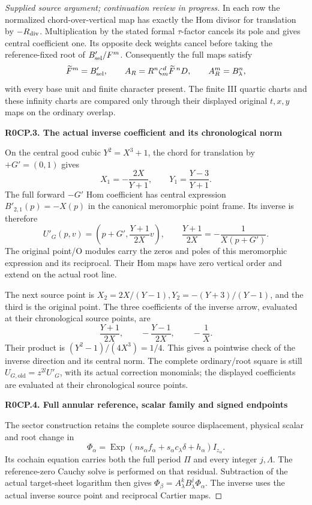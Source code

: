 \begin{proof}[Supplied source argument; continuation review in progress]
In each row the normalized chord-over-vertical map has exactly the
Hom divisor for translation by \(-R_{\rm div}\). Multiplication by
the stated formal \(\tau\)-factor cancels its pole and gives central
coefficient one. Its opposite deck weights cancel before taking the
reference-fixed root of \(B'_{\rm sel}/F^m\). Consequently the full
maps satisfy
\[
 \widetilde F^m=B'_{\rm sel},\qquad
 A_R=R^n\zeta_m^d\widetilde F^{\,n}D,\qquad
 A_R^m=B_\lambda^n,
\]
with every base unit and finite character present. The finite III
quartic charts and these infinity charts are compared only through
their displayed original \(t,x,y\) maps on the ordinary overlap.

\par

\medskip\noindent\textbf{R0CP.3. The actual inverse coefficient and its chronological norm}

\par\nobreak

On the central good cubic \(Y^2=X^3+1\), the chord for translation
by \(+G'=(0,1)\) gives
\[
 X_1=-\frac{2X}{Y+1},\qquad Y_1=\frac{Y-3}{Y+1}.
 \tag{R0CP.1}
\]
The full forward \(-G'\) Hom coefficient has central expression
\(B'_{2,1}(p)=-X(p)\) in the canonical meromorphic point frame.
Its inverse is therefore
\[
 U'_G(p,v)=
 \left(p+G',\frac{Y+1}{2X}v\right),
 \qquad
 \frac{Y+1}{2X}=-\frac1{X(p+G')}.
 \tag{R0CP.2}
\]
The original point/O modules carry the zeros and poles of this
meromorphic expression and its reciprocal. Their Hom maps have
zero vertical order and extend on the actual root line.

The next source point is
\(X_2=2X/(Y-1),Y_2=-(Y+3)/(Y-1)\), and the third is the original
point. The three coefficients of the inverse arrow, evaluated at
their chronological source points, are
\[
 \frac{Y+1}{2X},\qquad -\frac{Y-1}{2X},\qquad-\frac1X.
\]
Their product is \((Y^2-1)/(4X^3)=1/4\). This gives a pointwise
check of the inverse direction and its central norm.
The complete ordinary/root square is still
\(U_{G,\mathrm{old}}=z^{2l}U'_G\), with its actual correction
monomials; the displayed coefficients are evaluated at their chronological source points.

\par

\medskip\noindent\textbf{R0CP.4. Full annular reference, scalar family and signed endpoints}

\par\nobreak

The sector construction retains the complete source displacement,
physical scalar and root change in
\[
 \Phi_\alpha=\operatorname{Exp}
 (ns_\alpha f_\alpha+s_\alpha c_\lambda\delta+h_\alpha)I_{z_\alpha}.
\]
Its cochain equation carries both the full period \(\Pi\) and every
integer \(j,\Lambda\). The reference-zero Cauchy solve is performed
on that residual. Subtraction of the actual target-sheet logarithm
then gives \(\Phi_\beta=A_\lambda^kB_\lambda^j\Phi_\alpha\).
The inverse uses the actual inverse source point and reciprocal
Cartier maps.


\end{proof}
